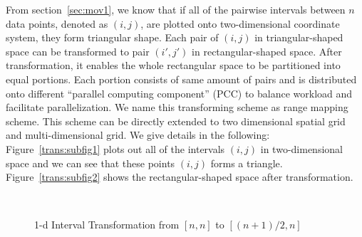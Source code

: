 \documentclass[10pt,journal,cspaper,compsoc]{IEEEtran}
\begin{document}
From section~\ref{sec:mov1}, we know that if all of the pairwise intervals between $n$ data points, denoted as $(i,j)$, are plotted onto two-dimensional coordinate system, they form triangular shape. Each pair of $(i,j)$ in triangular-shaped space can be transformed to pair $(i',j')$ in rectangular-shaped space. After transformation, it enables the whole rectangular space to be partitioned into equal portions. Each portion consists of same amount of pairs and is distributed onto different ``parallel computing component'' (PCC) to balance workload and facilitate parallelization. We name this transforming scheme as range mapping scheme. This scheme can be directly extended to two dimensional spatial grid and multi-dimensional grid. We give details in the following:\\
Figure~\ref{trans:subfig1} plots out all of the intervals $(i,j)$ in two-dimensional space and we can see that these points $(i,j)$ forms a triangle. Figure~\ref{trans:subfig2} shows the rectangular-shaped space after transformation.
\begin{figure}[h]
\centering
{}
~~
\caption{1-d Interval Transformation from $[n,n]$ to $[(n+1)/2,n]$}\label{modelBF}
\end{figure}
\end{document}
